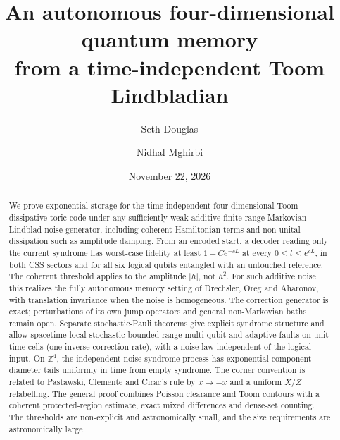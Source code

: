 \documentclass[11pt,letterpaper]{article}
\title{An autonomous four-dimensional quantum memory\\
from a time-independent Toom Lindbladian}
\author{Seth Douglas \and Nidhal Mghirbi}
\date{November 22, 2026}
\numberwithin{equation}{section}
\theoremstyle{definition}
\theoremstyle{remark}
\newcommand{\Z}{\mathbb Z}
\begin{document}
\maketitle
\begin{abstract}
We prove exponential storage for the time-independent four-dimensional
Toom dissipative toric code under any sufficiently weak additive
finite-range Markovian Lindblad noise generator, including coherent
Hamiltonian terms and non-unital dissipation such as amplitude damping.
From an encoded start, a decoder reading only the current syndrome
has worst-case fidelity at least \(1-Ce^{-cL}\) at every
\(0\le t\le e^{cL}\), in both CSS sectors and for all six logical
qubits entangled with an untouched reference.
The coherent threshold applies to the amplitude \(|h|\), not \(h^2\).
For such additive noise this realizes the fully autonomous memory
setting of Drechsler, Oreg and Aharonov, with translation invariance
when the noise is homogeneous.
The correction generator is exact; perturbations of its own jump
operators and general non-Markovian baths remain open.
Separate stochastic-Pauli theorems give explicit syndrome structure
and allow spacetime local stochastic bounded-range multi-qubit and
adaptive faults on unit time cells (one inverse correction rate),
with a noise law independent of the logical input.
On \(\Z^4\), the independent-noise syndrome process has exponential
component-diameter tails uniformly in time from empty syndrome.
The corner convention is related to Pastawski, Clemente and Cirac's
rule by \(x\mapsto-x\) and a uniform \(X/Z\) relabelling.
The general proof combines Poisson clearance and Toom contours with
a coherent protected-region estimate, exact mixed differences and
dense-set counting. The thresholds are non-explicit and
astronomically small, and the size requirements are astronomically
large.
\end{abstract}
\begin{center}
\end{center}
\tableofcontents













\end{document}
